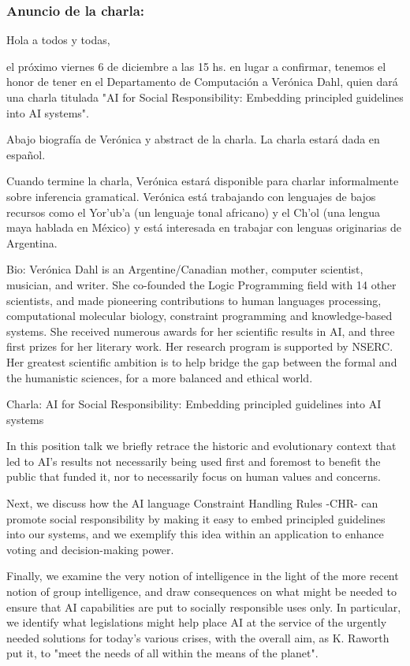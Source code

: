 \documentclass[a4paper,11pt]{article}
\begin{document}
\subsubsection{Anuncio de la charla: } Hola a todos y todas,

el próximo viernes 6 de diciembre a las 15 hs. en lugar a confirmar, tenemos el honor de tener en el Departamento de Computación a Verónica Dahl, quien dará una charla titulada "AI for Social Responsibility: Embedding principled guidelines into AI systems".

Abajo biografía de Verónica y abstract de la charla. La charla estará dada en español.

Cuando termine la charla, Verónica estará disponible para charlar informalmente sobre inferencia gramatical. Verónica está trabajando con lenguajes de bajos recursos como el Yor'ub'a (un lenguaje tonal africano) y el Ch’ol (una lengua maya hablada en México) y está interesada en trabajar con lenguas originarias de Argentina.


Bio: Verónica Dahl is an Argentine/Canadian mother, computer scientist, musician, and writer. She co-founded the Logic Programming field with 14 other scientists, and made pioneering contributions to human languages processing, computational molecular biology, constraint programming and knowledge-based systems. She received numerous awards for her scientific results in AI, and three first prizes for her literary work. Her research program is supported by NSERC. Her greatest scientific ambition is to help bridge the gap between the formal and the humanistic sciences, for a more balanced and ethical world.

Charla: AI for Social Responsibility: Embedding principled guidelines into AI systems

In this position talk we briefly retrace the historic and evolutionary context that led to AI's results not necessarily being used first and foremost to benefit the public that funded it, nor to necessarily focus on human values and concerns.

Next, we discuss how the AI language Constraint Handling Rules -CHR- can promote social responsibility by making it easy to embed principled guidelines into our systems, and we exemplify this idea within an application to enhance voting and decision-making power.

Finally, we examine the very notion of intelligence in the light of the more recent notion of group intelligence, and draw consequences on what might be needed to ensure that AI capabilities are put to socially responsible uses only. In particular, we identify what legislations might help place AI at the service of the urgently needed solutions for today's various crises, with the overall aim, as K. Raworth put it, to "meet the needs of all within the means of the planet".
\end{document}
